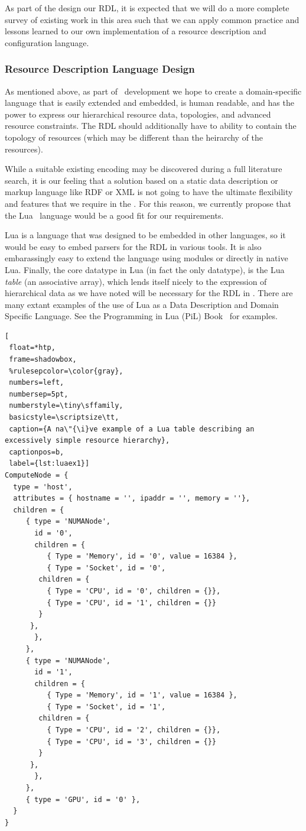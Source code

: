 As part of the design our RDL, it is expected that we will do a
more complete survey of existing work in this area such that we can
apply common practice and lessons learned to our own implementation
of a resource description and configuration language.

\subsubsection{Resource Description Language Design}

As mentioned above, as part of \ngrm\ development we hope to
create a domain-specific language that is
easily extended and embedded, is human readable, and has the
power to express our hierarchical resource data, topologies,
and advanced resource constraints. The RDL should additionally
have to ability to contain the topology of resources
(which may be different than the heirarchy of the resources).

While a suitable existing encoding may be discovered during
a full literature search, it is our feeling that a solution
based on a static data description or markup language like
RDF or XML is not going to have the ultimate flexibility and
features that we require in the \ngrm.  For this reason, we
currently propose that the Lua~\cite{LuaBook}
language would be a good fit for our requirements.

Lua is a language that was designed to be embedded in other
languages, so it would be easy to embed parsers for the RDL
in various tools. It is also embarassingly easy to extend the
language using modules or directly in native Lua. Finally,
the core datatype in Lua (in fact the only datatype), is
the Lua \emph{table} (an associative array), which lends
itself nicely to the expression of hierarchical data as
we have noted will be necessary for the RDL in \ngrm. There
are many extant examples of the use of Lua as a Data Description
and Domain Specific Language. See the Programming in Lua (PiL)
Book~\cite{LuaBook} for examples.

\begin{lstlisting}[
 float=*htp,
 frame=shadowbox,
 %rulesepcolor=\color{gray},
 numbers=left,
 numbersep=5pt,
 numberstyle=\tiny\sffamily,
 basicstyle=\scriptsize\tt,
 caption={A na\"{\i}ve example of a Lua table describing an excessively simple resource hierarchy},
 captionpos=b,
 label={lst:luaex1}]
ComputeNode = {
  type = 'host',
  attributes = { hostname = '', ipaddr = '', memory = ''},
  children = {
     { type = 'NUMANode',
       id = '0',
       children = {
          { Type = 'Memory', id = '0', value = 16384 },
          { Type = 'Socket', id = '0',
	    children = {
	      { Type = 'CPU', id = '0', children = {}},
	      { Type = 'CPU', id = '1', children = {}}
	    }
	  },
       },
     },
     { type = 'NUMANode',
       id = '1',
       children = {
          { Type = 'Memory', id = '1', value = 16384 },
          { Type = 'Socket', id = '1',
	    children = {
	      { Type = 'CPU', id = '2', children = {}},
	      { Type = 'CPU', id = '3', children = {}}
	    }
	  },
       },
     },
     { type = 'GPU', id = '0' },
  }
}
\end{lstlisting}


